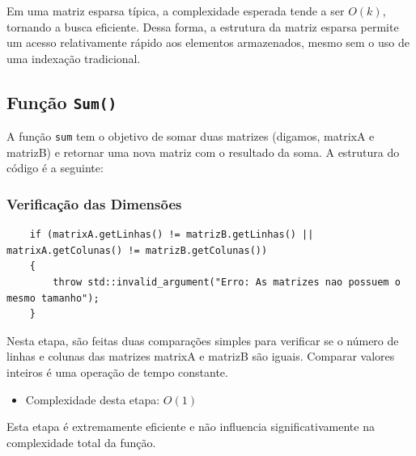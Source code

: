 \documentclass[12pt]{article}
\begin{document}
        Em uma matriz esparsa típica, a complexidade esperada tende a ser \textbf{\(O(k)\)}, tornando a busca eficiente. Dessa forma, a estrutura da matriz esparsa permite um acesso relativamente rápido aos elementos armazenados, mesmo sem o uso de uma indexação tradicional.  
    
    \subsection{Função \texttt{Sum()}}
        A função \texttt{sum} tem o objetivo de somar duas matrizes (digamos, matrixA e matrizB) e retornar uma nova matriz com o resultado da soma. A estrutura do código é a seguinte:
        
            \subsubsection{Verificação das Dimensões}
                \begin{lstlisting}
    if (matrixA.getLinhas() != matrizB.getLinhas() || matrixA.getColunas() != matrizB.getColunas())
    {
        throw std::invalid_argument("Erro: As matrizes nao possuem o mesmo tamanho");
    }
                \end{lstlisting}
            Nesta etapa, são feitas duas comparações simples para verificar se o número de linhas e colunas das matrizes matrixA e matrizB são iguais. Comparar valores inteiros é uma operação de tempo constante.

            \begin{itemize}
                \item Complexidade desta etapa: \(O(1)\)
            \end{itemize}

Esta etapa é extremamente eficiente e não influencia significativamente na complexidade total da função.
\end{document}
